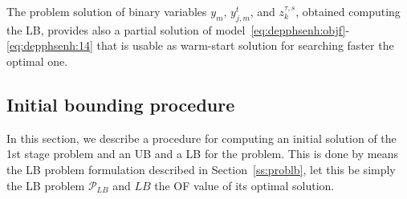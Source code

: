 \documentclass[a4paper,11pt]{article}
\begin{document}
	The problem solution of binary variables $ y_m$, $ y_{j,m}^t$, and $ z_k^{\tau,s}$, obtained computing the LB, provides also a partial solution of model~\eqref{eq:depphsenh:objf}-\eqref{eq:depphsenh:14} that is usable as warm-start solution for searching faster the optimal one.
	{
	\color{blue}
	\subsection{Initial bounding procedure}\label{ss:initproc}
	In this section, we describe a procedure for computing an initial solution of the 1st stage problem and an UB and a LB for the problem.
	This is done by means the LB problem formulation described in Section~\ref{ss:problb}, let this be simply the LB problem $ \mathcal{P}_{LB}$ and $ LB$ the OF value of its optimal solution.
	
}
\end{document}
